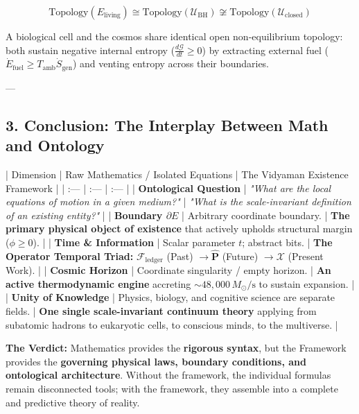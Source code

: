\documentclass[11pt,a4paper]{article}
\theoremstyle{definition}
\theoremstyle{remark}
\begin{document}
\begin{equation}
\boxed{\text{Topology}(E_{\text{living}}) \cong \text{Topology}(\mathcal{U}_{\text{BH}}) \not\cong \text{Topology}(\mathcal{U}_{\text{closed}})}
\end{equation}

  A biological cell and the cosmos share identical open non-equilibrium topology: both sustain negative internal entropy ($\frac{d\mathcal{G}}{dt} \ge 0$) by extracting external fuel ($\dot{E}_{\text{fuel}} \ge T_{\text{amb}}\dot{S}_{\text{gen}}$) and venting entropy across their boundaries.

---

\subsection{3. Conclusion: The Interplay Between Math and Ontology}

| Dimension | Raw Mathematics / Isolated Equations | The Vidyaman Existence Framework |
| :--- | :--- | :--- |
| \textbf{Ontological Question} | \textit{"What are the local equations of motion in a given medium?"} | \textit{"What is the scale-invariant definition of an existing entity?"} |
| \textbf{Boundary $\partial E$} | Arbitrary coordinate boundary. | \textbf{The primary physical object of existence} that actively upholds structural margin ($\phi \ge 0$). |
| \textbf{Time \& Information} | Scalar parameter $t$; abstract bits. | \textbf{The Operator Temporal Triad:} $\mathcal{F}_{\text{ledger}}$ (Past) $\to \hat{\mathbf{P}}$ (Future) $\to \boldsymbol{\mathcal{X}}$ (Present Work). |
| \textbf{Cosmic Horizon} | Coordinate singularity / empty horizon. | \textbf{An active thermodynamic engine} accreting $\sim 48,000 \, M_\odot/\mathrm{s}$ to sustain expansion. |
| \textbf{Unity of Knowledge} | Physics, biology, and cognitive science are separate fields. | \textbf{One single scale-invariant continuum theory} applying from subatomic hadrons to eukaryotic cells, to conscious minds, to the multiverse. |

\textbf{The Verdict:} Mathematics provides the \textbf{rigorous syntax}, but the Framework provides the \textbf{governing physical laws, boundary conditions, and ontological architecture}. Without the framework, the individual formulas remain disconnected tools; with the framework, they assemble into a complete and predictive theory of reality.
\end{document}
